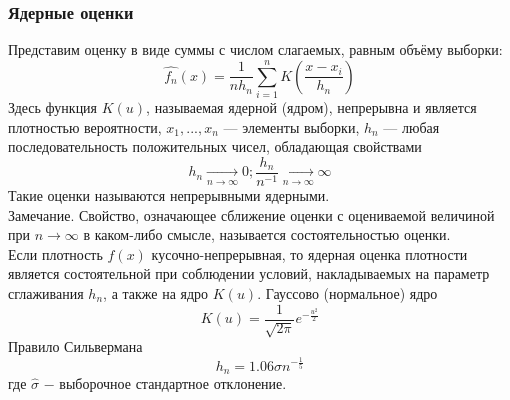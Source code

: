 	\subsubsection{Ядерные оценки}	
		Представим оценку в виде суммы с числом слагаемых, равным объёму выборки:
		\begin{equation}
			{\hat{f_n}(x) = \frac{1}{nh_n}\sum\limits_{i=1}^{n}K(\frac{x-x_i}{h_n})}
		\end{equation}
		Здесь функция $K(u)$, называемая ядерной (ядром), непрерывна и является
		плотностью вероятности, $x_1, ..., x_n$ — элементы выборки, ${h_n}$ — любая
		последовательность положительных чисел, обладающая свойствами
		\begin{equation}
			{h_n \xrightarrow[n\to\infty]{}0; \frac{h_n}{n^{-1}} \xrightarrow[n\to\infty]{}\infty}
		\end{equation}
		Такие оценки называются непрерывными ядерными.\\
		
		Замечание. Свойство, означающее сближение оценки с оцениваемой величиной при $n\to\infty$ в каком-либо смысле, называется состоятельностью оценки. \\
		Если плотность $f(x)$ кусочно-непрерывная, то ядерная оценка плотности
		является состоятельной при соблюдении условий, накладываемых на параметр сглаживания $h_n$, а также на ядро $K(u)$.
		Гауссово (нормальное) ядро
		\begin{equation}
			{K(u)=\frac{1}{\sqrt{2\pi}}e^{-\frac{u^2}{2}}}
		\end{equation}
		Правило Сильвермана
		\begin{equation}
			{h_n = 1.06\hat{\sigma}n^{-\frac{1}{5}}}
		\end{equation}
		где $\hat{\sigma}$ $-$ выборочное стандартное отклонение.